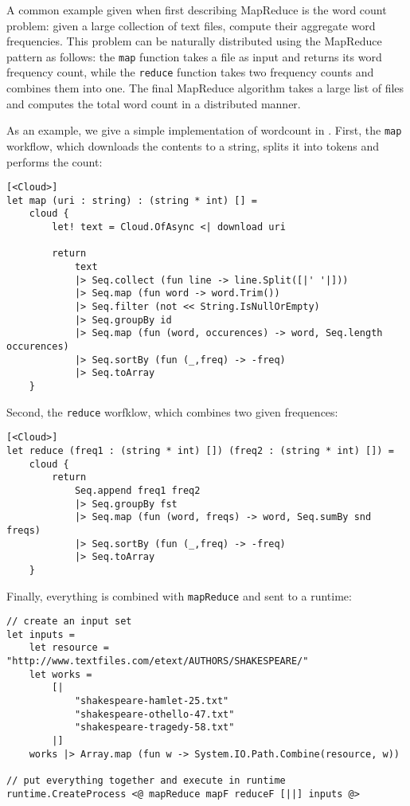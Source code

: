 A common example given when first describing MapReduce is the word count problem:
given a large collection of text files, compute their aggregate word frequencies.
This problem can be naturally distributed using the MapReduce pattern as follows:
the \texttt{map} function takes a file as input and returns its word frequency
count, while the \texttt{reduce} function takes two frequency counts and combines 
them into one.
The final MapReduce algorithm takes a large list of files and computes the total word
count in a distributed manner.

As an example, we give a simple implementation of wordcount in \mbrace{}.
First, the \texttt{map} workflow, which downloads the contents to a string,
splits it into tokens and performs the count:
\begin{lstlisting}
[<Cloud>]
let map (uri : string) : (string * int) [] =
    cloud {
        let! text = Cloud.OfAsync <| download uri

        return
            text
            |> Seq.collect (fun line -> line.Split([|' '|]))
            |> Seq.map (fun word -> word.Trim())
            |> Seq.filter (not << String.IsNullOrEmpty)
            |> Seq.groupBy id
            |> Seq.map (fun (word, occurences) -> word, Seq.length occurences)
            |> Seq.sortBy (fun (_,freq) -> -freq)
            |> Seq.toArray
    }
\end{lstlisting}
Second, the \texttt{reduce} worfklow, which combines two given frequences:
\begin{lstlisting}
[<Cloud>]
let reduce (freq1 : (string * int) []) (freq2 : (string * int) []) =
    cloud {
        return
            Seq.append freq1 freq2
            |> Seq.groupBy fst
            |> Seq.map (fun (word, freqs) -> word, Seq.sumBy snd freqs)
            |> Seq.sortBy (fun (_,freq) -> -freq)
            |> Seq.toArray
    }
\end{lstlisting}
Finally, everything is combined with \texttt{mapReduce} and sent to a runtime:
\begin{lstlisting}
// create an input set
let inputs =
    let resource = "http://www.textfiles.com/etext/AUTHORS/SHAKESPEARE/"
    let works =
        [|
            "shakespeare-hamlet-25.txt"
            "shakespeare-othello-47.txt"
            "shakespeare-tragedy-58.txt"
        |]
    works |> Array.map (fun w -> System.IO.Path.Combine(resource, w))
    
// put everything together and execute in runtime
runtime.CreateProcess <@ mapReduce mapF reduceF [||] inputs @>
\end{lstlisting}

